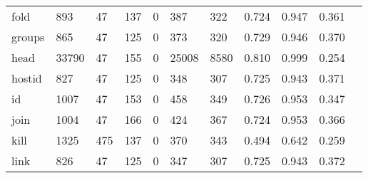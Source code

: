 \begin{longtable}{lp{1.10cm}p{1.10cm}p{1.10cm}p{1.10cm}p{1.10cm}p{1.10cm}p{1.10cm}p{1.10cm}p{1.10cm}p{1.10cm}}
fold      &                    893 &                                 47 &                               137 &                                0 &                               387 &                             322 &                             0.724 &                                 0.947 &                               0.361 \\
groups    &                    865 &                                 47 &                               125 &                                0 &                               373 &                             320 &                             0.729 &                                 0.946 &                               0.370 \\
head      &                  33790 &                                 47 &                               155 &                                0 &                             25008 &                            8580 &                             0.810 &                                 0.999 &                               0.254 \\
hostid    &                    827 &                                 47 &                               125 &                                0 &                               348 &                             307 &                             0.725 &                                 0.943 &                               0.371 \\
id        &                   1007 &                                 47 &                               153 &                                0 &                               458 &                             349 &                             0.726 &                                 0.953 &                               0.347 \\
join      &                   1004 &                                 47 &                               166 &                                0 &                               424 &                             367 &                             0.724 &                                 0.953 &                               0.366 \\
kill      &                   1325 &                                475 &                               137 &                                0 &                               370 &                             343 &                             0.494 &                                 0.642 &                               0.259 \\
link      &                    826 &                                 47 &                               125 &                                0 &                               347 &                             307 &                             0.725 &                                 0.943 &                               0.372 \\

\end{longtable}
